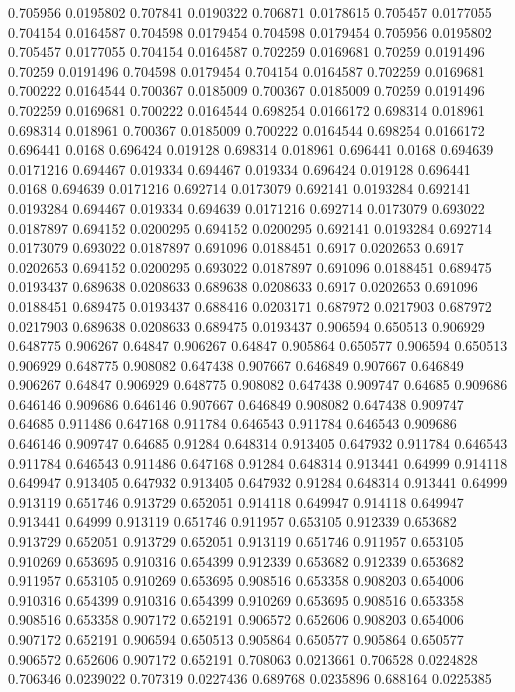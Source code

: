 0.705956 0.0195802
0.707841 0.0190322
0.706871 0.0178615
0.705457 0.0177055
0.704154 0.0164587
0.704598 0.0179454
0.704598 0.0179454
0.705956 0.0195802
0.705457 0.0177055
0.704154 0.0164587
0.702259 0.0169681
0.70259 0.0191496
0.70259 0.0191496
0.704598 0.0179454
0.704154 0.0164587
0.702259 0.0169681
0.700222 0.0164544
0.700367 0.0185009
0.700367 0.0185009
0.70259 0.0191496
0.702259 0.0169681
0.700222 0.0164544
0.698254 0.0166172
0.698314 0.018961
0.698314 0.018961
0.700367 0.0185009
0.700222 0.0164544
0.698254 0.0166172
0.696441 0.0168
0.696424 0.019128
0.698314 0.018961
0.696441 0.0168
0.694639 0.0171216
0.694467 0.019334
0.694467 0.019334
0.696424 0.019128
0.696441 0.0168
0.694639 0.0171216
0.692714 0.0173079
0.692141 0.0193284
0.692141 0.0193284
0.694467 0.019334
0.694639 0.0171216
0.692714 0.0173079
0.693022 0.0187897
0.694152 0.0200295
0.694152 0.0200295
0.692141 0.0193284
0.692714 0.0173079
0.693022 0.0187897
0.691096 0.0188451
0.6917 0.0202653
0.6917 0.0202653
0.694152 0.0200295
0.693022 0.0187897
0.691096 0.0188451
0.689475 0.0193437
0.689638 0.0208633
0.689638 0.0208633
0.6917 0.0202653
0.691096 0.0188451
0.689475 0.0193437
0.688416 0.0203171
0.687972 0.0217903
0.687972 0.0217903
0.689638 0.0208633
0.689475 0.0193437
0.906594 0.650513
0.906929 0.648775
0.906267 0.64847
0.906267 0.64847
0.905864 0.650577
0.906594 0.650513
0.906929 0.648775
0.908082 0.647438
0.907667 0.646849
0.907667 0.646849
0.906267 0.64847
0.906929 0.648775
0.908082 0.647438
0.909747 0.64685
0.909686 0.646146
0.909686 0.646146
0.907667 0.646849
0.908082 0.647438
0.909747 0.64685
0.911486 0.647168
0.911784 0.646543
0.911784 0.646543
0.909686 0.646146
0.909747 0.64685
0.91284 0.648314
0.913405 0.647932
0.911784 0.646543
0.911784 0.646543
0.911486 0.647168
0.91284 0.648314
0.913441 0.64999
0.914118 0.649947
0.913405 0.647932
0.913405 0.647932
0.91284 0.648314
0.913441 0.64999
0.913119 0.651746
0.913729 0.652051
0.914118 0.649947
0.914118 0.649947
0.913441 0.64999
0.913119 0.651746
0.911957 0.653105
0.912339 0.653682
0.913729 0.652051
0.913729 0.652051
0.913119 0.651746
0.911957 0.653105
0.910269 0.653695
0.910316 0.654399
0.912339 0.653682
0.912339 0.653682
0.911957 0.653105
0.910269 0.653695
0.908516 0.653358
0.908203 0.654006
0.910316 0.654399
0.910316 0.654399
0.910269 0.653695
0.908516 0.653358
0.908516 0.653358
0.907172 0.652191
0.906572 0.652606
0.908203 0.654006
0.907172 0.652191
0.906594 0.650513
0.905864 0.650577
0.905864 0.650577
0.906572 0.652606
0.907172 0.652191
0.708063 0.0213661
0.706528 0.0224828
0.706346 0.0239022
0.707319 0.0227436
0.689768 0.0235896
0.688164 0.0225385

